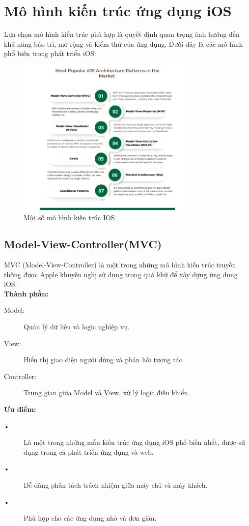 \section{Mô hình kiến trúc ứng dụng iOS}
Lựa chọn mô hình kiến trúc phù hợp là quyết định quan trọng ảnh hưởng đến khả năng bảo trì, mở rộng và kiểm thử của ứng dụng. Dưới đây là các mô hình phổ biến trong phát triển iOS:

\begin{figure}[H] 
    \centering
    \includegraphics[width=0.8\textwidth]{images/mohinhkientrucios.png}
     \caption{Một số mô hình kiến trúc IOS}
    \label{fig:mohinhkientrucios}
\end{figure}
    \subsection{Model-View-Controller(MVC)}
    MVC (Model-View-Controller) là một trong những mô hình kiến trúc truyền thống được Apple khuyến nghị sử dụng trong quá khứ để xây dựng ứng dụng iOS.\\
    \vspace{1em}
    \textbf{Thành phần:}
    \begin{description}
      \item[Model:] Quản lý dữ liệu và logic nghiệp vụ.
      \item[View:] Hiển thị giao diện người dùng và phản hồi tương tác.
      \item[Controller:] Trung gian giữa Model và View, xử lý logic điều khiển.
    \end{description}
    
    \vspace{1em}
    \textbf{Ưu điểm:}
    \begin{description}
      \item[•] Là một trong những mẫu kiến trúc ứng dụng iOS phổ biến nhất, được sử dụng trong cả phát triển ứng dụng và web.
      \item[•] Dễ dàng phân tách trách nhiệm giữa máy chủ và máy khách.
      \item[•] Phù hợp cho các ứng dụng nhỏ và đơn giản.
    \end{description}
    
